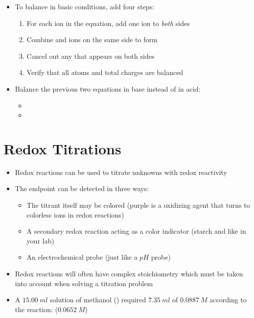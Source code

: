 \documentclass[12pt, openany, letterpaper]{memoir}
\begin{document}
\begin{itemize}
	\item To balance in basic conditions, add four steps:
	\begin{enumerate}
		\item For each  ion in the equation, add one  ion to \emph{both} sides
		\item Combine  and  ions on the same side to form 
		\item Cancel out any  that appears on both sides
		\item Verify that all atoms and total charges are balanced
	\end{enumerate}
	\item Balance the previous two equations in base instead of in acid:
	\begin{itemize}
		\item {}
		\item {}
	\end{itemize}
\end{itemize}
\section{Redox Titrations}
\begin{itemize}
	\item Redox reactions can be used to titrate unknowns with redox reactivity
	\item The endpoint can be detected in three ways:
	\begin{itemize}
		\item The titrant itself may be colored (purple  is a oxidizing agent that turns to colorless  ions in redox reactions)
		\item A secondary redox reaction acting as a color indicator (starch and  like in your lab)
		\item An electrochemical probe (just like a $pH$ probe)
	\end{itemize}
	\item Redox reactions will often have complex stoichiometry which must be taken into account when solving a titration problem
	\item A $15.00~ml$ solution of methanol () required $7.35~ml$ of $0.0887~M$  according to the reaction:  ($0.0652~M$)
\end{itemize}
\end{document}
